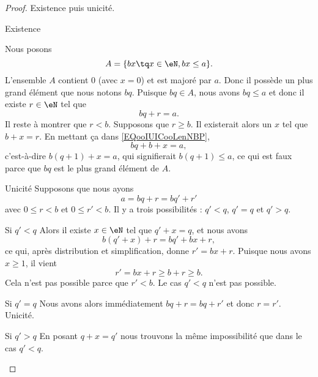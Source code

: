 \begin{proof}
    Existence puis unicité.
    \begin{subproof}
    \item[Existence]
    
    Nous posons
    \begin{equation}
        A=\{ bx\tq x\in \eN,bx\leq a \}.
    \end{equation}
    L'ensemble \( A\) contient \( 0\) (avec \( x=0\)) et est majoré par \( a\). Donc il possède un plus grand élément que nous notons \( bq\). Puisque \( bq\in A\), nous avons \( bq\leq a\) et donc il existe \( r\in \eN\) tel que
    \begin{equation}        \label{EQooIUICooLenNBP}
        bq+r=a.
    \end{equation}
    Il reste à montrer que \( r<b\). Supposons que \( r\geq b\). Il existerait alors un \( x\) tel que \( b+x=r\). En mettant ça dans \eqref{EQooIUICooLenNBP},
    \begin{equation}
        bq+b+x=a,
    \end{equation}
    c'est-à-dire \( b(q+1)+x=a\), qui signifierait \( b(q+1)\leq a\), ce qui est faux parce que \( bq\) est le plus grand élément de \( A\).
\item[Unicité]
    Supposons que nous ayons
    \begin{equation}
        a=bq+r=bq'+r'
    \end{equation}
    avec \( 0\leq r<b\) et \( 0\leq r'<b\). Il y a trois possibilités : \( q'<q\), \( q'=q\) et \( q'>q\).
    \begin{subproof}
    \item[Si \( q'<q\)]
        Alors il existe \( x\in \eN\) tel que \( q'+x=q\), et nous avons
        \begin{equation}
            b(q'+x)+r=bq'+bx+r,
        \end{equation}
        ce qui, après distribution et simplification, donne \( r'=bx+r\). Puisque nous avons \( x\geq 1\), il vient
        \begin{equation}
            r'=bx+r\geq b+r\geq b.
        \end{equation}
        Cela n'est pas possible parce que \( r'<b\). Le cas \( q'<q\) n'est pas possible.
    \item[Si \( q'=q\)]
        Nous avons alors immédiatement \( bq+r=bq+r'\) et donc \( r=r'\). Unicité.
    \item[Si \( q'>q\)]
        En posant \( q+x=q'\) nous trouvons la même impossibilité que dans le cas \( q'<q\).
    \end{subproof}
    \end{subproof}
\end{proof}

